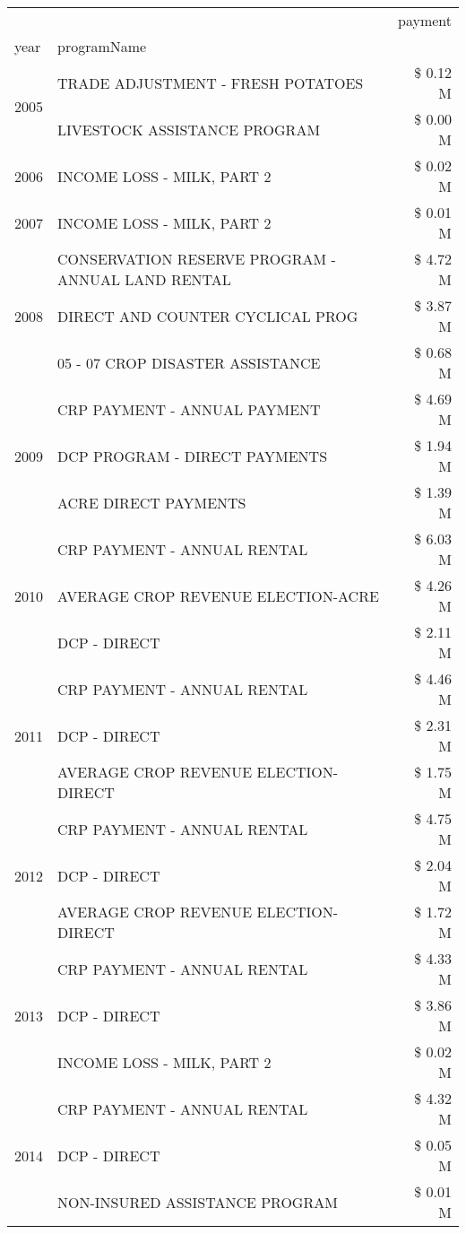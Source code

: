\begin{tabular}{llr}
\toprule
 &  & payment \\
year & programName &  \\
\midrule
\multirow[t]{2}{*}{2005} & TRADE ADJUSTMENT - FRESH POTATOES & \$ 0.12 M \\
 & LIVESTOCK ASSISTANCE PROGRAM & \$ 0.00 M \\
\cline{1-3}
2006 & INCOME LOSS - MILK, PART 2 & \$ 0.02 M \\
\cline{1-3}
2007 & INCOME LOSS - MILK, PART 2 & \$ 0.01 M \\
\cline{1-3}
\multirow[t]{3}{*}{2008} & CONSERVATION RESERVE PROGRAM - ANNUAL LAND RENTAL & \$ 4.72 M \\
 & DIRECT AND COUNTER CYCLICAL PROG & \$ 3.87 M \\
 & 05 - 07 CROP DISASTER ASSISTANCE & \$ 0.68 M \\
\cline{1-3}
\multirow[t]{3}{*}{2009} & CRP PAYMENT - ANNUAL PAYMENT & \$ 4.69 M \\
 & DCP PROGRAM - DIRECT PAYMENTS & \$ 1.94 M \\
 & ACRE DIRECT PAYMENTS & \$ 1.39 M \\
\cline{1-3}
\multirow[t]{3}{*}{2010} & CRP PAYMENT - ANNUAL RENTAL & \$ 6.03 M \\
 & AVERAGE CROP REVENUE ELECTION-ACRE & \$ 4.26 M \\
 & DCP - DIRECT & \$ 2.11 M \\
\cline{1-3}
\multirow[t]{3}{*}{2011} & CRP PAYMENT - ANNUAL RENTAL & \$ 4.46 M \\
 & DCP - DIRECT & \$ 2.31 M \\
 & AVERAGE CROP REVENUE ELECTION-DIRECT & \$ 1.75 M \\
\cline{1-3}
\multirow[t]{3}{*}{2012} & CRP PAYMENT - ANNUAL RENTAL & \$ 4.75 M \\
 & DCP - DIRECT & \$ 2.04 M \\
 & AVERAGE CROP REVENUE ELECTION-DIRECT & \$ 1.72 M \\
\cline{1-3}
\multirow[t]{3}{*}{2013} & CRP PAYMENT - ANNUAL RENTAL & \$ 4.33 M \\
 & DCP - DIRECT & \$ 3.86 M \\
 & INCOME LOSS - MILK, PART 2 & \$ 0.02 M \\
\cline{1-3}
\multirow[t]{3}{*}{2014} & CRP PAYMENT - ANNUAL RENTAL & \$ 4.32 M \\
 & DCP - DIRECT & \$ 0.05 M \\
 & NON-INSURED ASSISTANCE PROGRAM & \$ 0.01 M \\

\end{tabular}
